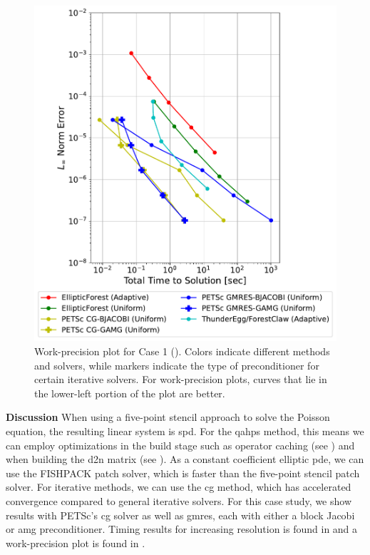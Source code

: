 \begin{figure}
    \centering
    \includegraphics[width=1.0\textwidth, clip=true, trim={0 0 0 0}]{figures/case01-work-precision-plots-no-title.pdf}
    \caption{Work-precision plot for Case 1 (). Colors indicate different methods and solvers, while markers indicate the type of preconditioner for certain iterative solvers. For work-precision plots, curves that lie in the lower-left portion of the plot are better.}
    \label{fig:case01-work-precision-plot}
\end{figure}

{\bf Discussion}
When using a five-point stencil approach to solve the Poisson equation, the resulting linear system is \gls{spd}. For the \gls{qahps} method, this means we can employ optimizations in the build stage such as operator caching (see ) and when building the \gls{d2n} matrix (see ). As a constant coefficient elliptic \gls{pde}, we can use the FISHPACK patch solver, which is faster than the five-point stencil patch solver. For iterative methods, we can use the \gls{cg} method, which has accelerated convergence compared to general iterative solvers. For this case study, we show results with PETSc's \gls{cg} solver as well as \gls{gmres}, each with either a block Jacobi or \gls{amg} preconditioner. Timing results for increasing resolution is found in  and a work-precision plot is found in .

